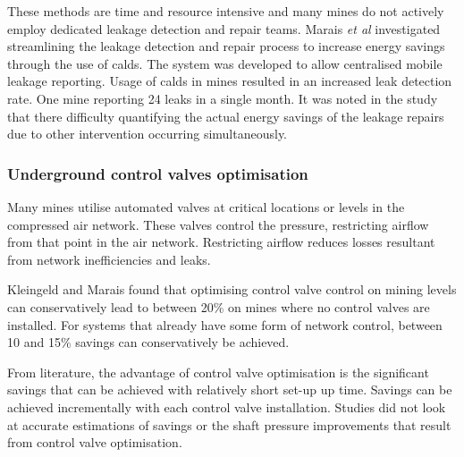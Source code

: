 	 	 These methods are time and resource intensive and many mines do not actively employ dedicated leakage detection and repair teams. Marais \textit{et al} \cite{marais2009increased} investigated streamlining the leakage detection and repair process to increase energy savings through the use of \gls{calds}. The system was developed to allow centralised mobile leakage reporting. Usage of \gls{calds} in mines resulted in an increased leak detection rate. One mine reporting 24 leaks in a single month. It was noted in the study that there difficulty quantifying the actual energy savings of the leakage repairs due to other intervention occurring simultaneously.	
		 
		 \subsubsection{Underground control valves optimisation}
		 Many mines utilise automated valves at critical locations or levels in the compressed air network. These valves control the pressure, restricting airflow from that point in the air network. Restricting airflow reduces losses resultant from network inefficiencies and leaks.
		 \par 
		 Kleingeld and Marais \cite{kleingeld2010high} found that optimising control valve control on mining levels can conservatively lead to between 20\% on mines where no control valves are installed. For systems that already have some form of network control, between 10 and 15\% savings can conservatively be achieved.
		 \par 
		 From literature, the advantage of control valve optimisation is the significant savings that can be achieved with relatively short set-up up time. Savings can be achieved incrementally with each control valve installation. Studies did not look at accurate estimations of savings or the shaft pressure improvements that result from control valve optimisation.	 
